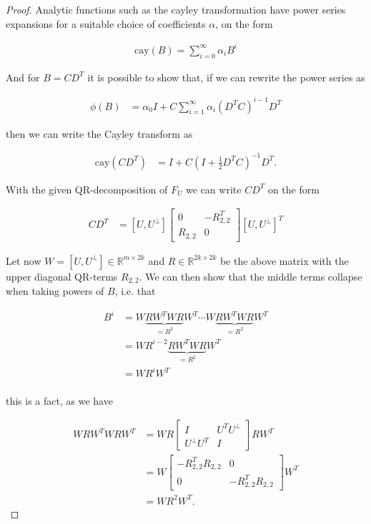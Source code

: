 \documentclass[11pt,a4paper,english]{elsarticle}%
\begin{document}
\begin{proof}
  Analytic functions such as the cayley transformation have power series expansions for a suitable choice of coefficients $\alpha$, on the form

  \begin{align*}
    \text{cay}(B) = \sum_{i=0}^{\infty} \alpha_i B^i
  \end{align*}

  And for $B = CD^T$ it is possible to show that, if we can rewrite the power series as

  \begin{align*}
    \phi(B) &= \alpha_0 I + C \sum_{i=1}^{\infty}\alpha_i (D^TC)^{i-1}D^T
  \end{align*}

  \noindent then we can write the Cayley transform as

  \begin{align*}
    \text{cay}(CD^T) &= I + C(I+\frac{1}{2}D^TC)^{-1}D^T.
  \end{align*}

With the given QR-decomposition of $F_U$ we can write $CD^T$ on the form

  \begin{align*}
    CD^T &= [U,U^{\perp}]
    \begin{bmatrix}
      0&-R^T_{2,2}\\
      R_{2,2}&0
    \end{bmatrix}
    [U,U^{\perp}]^T
  \end{align*}


  Let now $W =  [U,U^{\perp}] \in \mathbb{R}^{m \times 2k}$ and $R \in \mathbb{R}^{2k \times 2k}$ be the above matrix with the upper diagonal QR-terms $R_{2,2}$. We can then show that the middle terms collapse when taking powers of $B$, i.e. that

  \begin{align*}
    B^i &= W\underbrace{RW^TWR}_{= R^2}W^T \cdots W\underbrace{RW^TWR}_{= R^2}W^T\\
    &= WR^{i-2}\underbrace{RW^TWR}_{= R^2}W^T\\
    &= WR^iW^T\\
  \end{align*}

  this is a fact, as we have

  \begin{align*}
    WRW^TWRW^T &= WR
    \begin{bmatrix}
    I&U^TU^{\perp}\\
    U^{\perp}U^T &I
    \end{bmatrix}
    RW^T\\
    &= W
    \begin{bmatrix}
    -R_{2,2}^TR_{2,2}&0\\
    0 &-R_{2,2}^TR_{2,2}
    \end{bmatrix}
    W^T\\
    &= WR^2W^T.
  \end{align*}


\end{proof}
\end{document}
